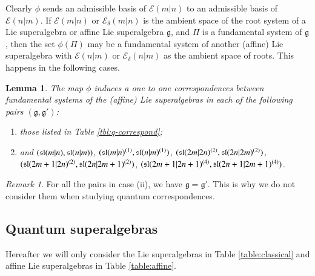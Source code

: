 \documentclass[12pt]{amsart}
\newtheorem{lemma}[theorem]{Lemma}
\theoremstyle{definition}
\theoremstyle{remark}
\newtheorem{remark}[theorem]{Remark}
\numberwithin{equation}{section}
\begin{document}
Clearly $\phi$ sends an admissible basis of ${\mathcal E}(m|n)$ to an admissible basis of
${\mathcal E}(n|m)$.  If ${\mathcal E}(m|n)$ or ${\mathcal E}_\delta(m|n)$ is the ambient space of the root system of a Lie superalgebra or affine Lie superalgebra ${{\mathfrak g}}$, and $\Pi$ is a fundamental system of ${{\mathfrak g}}$, then the set $\phi(\Pi)$ may be a fundamental system of another (affine) Lie superalgebra with ${\mathcal E}(n|m)$ or ${\mathcal E}_{\delta}(n|m)$ as the ambient space of roots. This happens in the following cases.
\begin{lemma}\label{lem:connection phi}
The map $\phi$ induces a one to one correspondences between fundamental systems of the (affine) Lie superalgebras in  each of the following pairs $({{\mathfrak g}}, {{\mathfrak g}}')$:
\begin{enumerate}
\item[(i).] those listed in Table \ref{tbl:q-correspond};
\item[(ii).] \label{sl-pairs}  and $({{\rm\mathfrak{sl}}}(m|n), {{\rm\mathfrak{sl}}}(n|m))$, $({{\rm\mathfrak{sl}}}(m|n)^{(1)}, {{\rm\mathfrak{sl}}}(n|m)^{(1)})$, $({{\rm\mathfrak{sl}}}(2m|2n)^{(2)}, {{\rm\mathfrak{sl}}}(2n|2m)^{(2)})$,\\  $({{\rm\mathfrak{sl}}}(2m+1|2n)^{(2)}, {{\rm\mathfrak{sl}}}(2n|2m+1)^{(2)})$, $({{\rm\mathfrak{sl}}}(2m+1|2n+1)^{(4)},{{\rm\mathfrak{sl}}}(2n+1|2m+1)^{(4)})$.
\end{enumerate}
\end{lemma}

\begin{remark} For all the pairs in case (ii), we have ${{\mathfrak g}}={{\mathfrak g}}'$. This is why we do not consider them when studying quantum correspondences.
\end{remark}

\subsection{Quantum superalgebras} Hereafter we will only
consider the Lie superalgebras in Table \ref{table:classical} and  affine Lie superalgebras in Table \ref{table:affine}.
\end{document}
